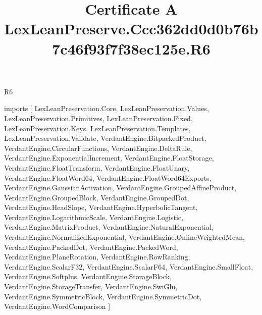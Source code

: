 \begin{lexlean}{R6}
\title{Certificate A LexLeanPreserve.Ccc362dd0d0b76b7c46f93f7f38ec125e.R6}
\begin{coremodule}
imports [
  LexLeanPreservation.Core,
  LexLeanPreservation.Values,
  LexLeanPreservation.Primitives,
  LexLeanPreservation.Fixed,
  LexLeanPreservation.Keys,
  LexLeanPreservation.Templates,
  LexLeanPreservation.Validate,
  VerdantEngine.BitpackedProduct,
  VerdantEngine.CircularFunctions,
  VerdantEngine.DeltaRule,
  VerdantEngine.ExponentialIncrement,
  VerdantEngine.FloatStorage,
  VerdantEngine.FloatTransform,
  VerdantEngine.FloatUnary,
  VerdantEngine.FloatWord64,
  VerdantEngine.FloatWord64Exports,
  VerdantEngine.GaussianActivation,
  VerdantEngine.GroupedAffineProduct,
  VerdantEngine.GroupedBlock,
  VerdantEngine.GroupedDot,
  VerdantEngine.HeadSlope,
  VerdantEngine.HyperbolicTangent,
  VerdantEngine.LogarithmicScale,
  VerdantEngine.Logistic,
  VerdantEngine.MatrixProduct,
  VerdantEngine.NaturalExponential,
  VerdantEngine.NormalizedExponential,
  VerdantEngine.OnlineWeightedMean,
  VerdantEngine.PackedDot,
  VerdantEngine.PackedWord,
  VerdantEngine.PlaneRotation,
  VerdantEngine.RowRanking,
  VerdantEngine.ScalarF32,
  VerdantEngine.ScalarF64,
  VerdantEngine.SmallFloat,
  VerdantEngine.Softplus,
  VerdantEngine.StorageBlock,
  VerdantEngine.StorageTransfer,
  VerdantEngine.SwiGlu,
  VerdantEngine.SymmetricBlock,
  VerdantEngine.SymmetricDot,
  VerdantEngine.WordComparison
]


\end{coremodule}
\end{lexlean}
